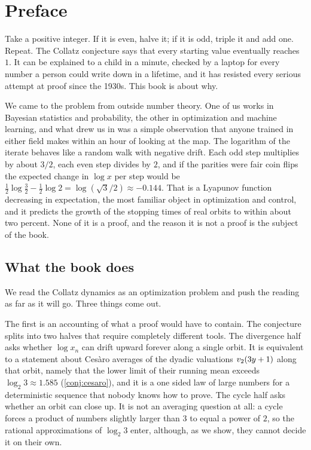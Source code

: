 \chapter*{Preface}

Take a positive integer. If it is even, halve it; if it is odd, triple it and
add one. Repeat. The Collatz conjecture says that every starting value
eventually reaches $1$. It can be explained to a child in a minute, checked by
a laptop for every number a person could write down in a lifetime, and it has
resisted every serious attempt at proof since the 1930s. This book is about
why.

We came to the problem from outside number theory. One of us works in Bayesian
statistics and probability, the other in optimization and machine learning,
and what drew us in was a simple observation that anyone trained in either
field makes within an hour of looking at the map. The logarithm of the iterate
behaves like a random walk with negative drift. Each odd step multiplies by
about $3/2$, each even step divides by $2$, and if the parities were fair coin
flips the expected change in $\log x$ per step would be
$\tfrac12\log\tfrac32-\tfrac12\log2=\log(\sqrt3/2)\approx-0.144$. That is a
Lyapunov function decreasing in expectation, the most familiar object in
optimization and control, and it predicts the growth of the stopping times of
real orbits to within about two percent. None of it is a proof, and the reason it is not a
proof is the subject of the book.

\section*{What the book does}

We read the Collatz dynamics as an optimization problem and push the reading
as far as it will go. Three things come out.

The first is an accounting of what a proof would have to contain. The
conjecture splits into two halves that require completely different tools.
The divergence half asks whether $\log x_n$ can drift upward forever along a
single orbit.
It is equivalent to a statement about Ces\`aro averages of the dyadic valuations $v_2(3y+1)$ along that orbit, namely that the lower limit of their running mean exceeds $\log_2 3\approx1.585$ (\cref{conj:cesaro}), and it is a one sided law of large numbers for a deterministic sequence that nobody knows how to prove.
The cycle half asks
whether an orbit can close up. It is not an averaging question at all: a cycle
forces a product of numbers slightly larger than $3$ to equal a power of $2$,
so the rational approximations of $\log_2 3$ enter, although, as we show, they cannot decide it on their own.


